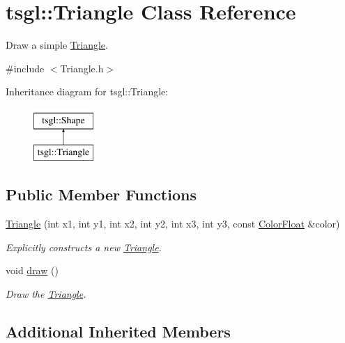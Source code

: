 \hypertarget{classtsgl_1_1_triangle}{}\section{tsgl\+:\+:Triangle Class Reference}
\label{classtsgl_1_1_triangle}


Draw a simple \hyperlink{classtsgl_1_1_triangle}{Triangle}.  




{\ttfamily \#include $<$Triangle.\+h$>$}

Inheritance diagram for tsgl\+:\+:Triangle\+:\begin{figure}[H]
\begin{center}
\leavevmode
\includegraphics[height=2.000000cm]{classtsgl_1_1_triangle}
\end{center}
\end{figure}
\subsection*{Public Member Functions}
\begin{DoxyCompactItemize}
\item 
\hyperlink{classtsgl_1_1_triangle_a5ee7f4735479c2692d1d6a2d22ba5c28}{Triangle} (int x1, int y1, int x2, int y2, int x3, int y3, const \hyperlink{structtsgl_1_1_color_float}{Color\+Float} \&color)
\begin{DoxyCompactList}\small\item\em Explicitly constructs a new \hyperlink{classtsgl_1_1_triangle}{Triangle}. \end{DoxyCompactList}\item 
void \hyperlink{classtsgl_1_1_triangle_a83b30f9f7c800146fa900d32a58fa0c7}{draw} ()
\begin{DoxyCompactList}\small\item\em Draw the \hyperlink{classtsgl_1_1_triangle}{Triangle}. \end{DoxyCompactList}\end{DoxyCompactItemize}
\subsection*{Additional Inherited Members}


